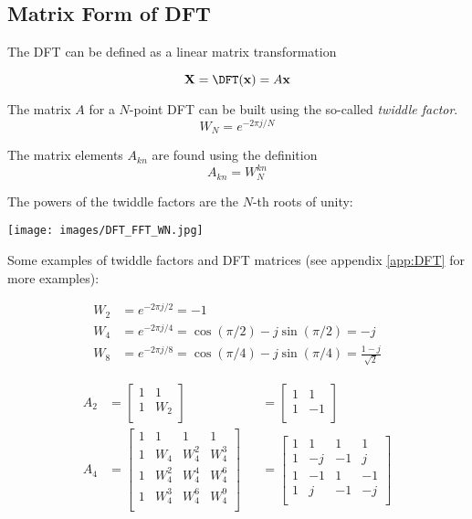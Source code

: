 \subsection{Matrix Form of DFT}
The DFT can be defined as a linear matrix transformation

\begin{equation*}
	\mathbf{X} = \DFT(\mathbf{x}) = A \mathbf{x}
\end{equation*}

The matrix $A$ for a $N$-point DFT can be built using the so-called
\emph{twiddle factor}.
\begin{equation*}
	W_N = e^{-2 \pi j / N}
\end{equation*}

The matrix elements $A_{kn}$ are found using the definition
\begin{equation*}
	A_{kn} = W_N^{kn}
\end{equation*}

The powers of the twiddle factors are the $N$-th roots of unity:
\begin{center}
	\texttt{[image: images/DFT\_FFT\_WN.jpg]}
\end{center}

Some examples of twiddle factors and DFT matrices (see appendix
\ref{app:DFT} for more examples):

\begin{align*}
	W_2 &= e^{-2\pi j / 2} = -1 \\
	W_4 &= e^{-2\pi j / 4} = \cos(\pi/2) - j\sin(\pi/2) = -j \\
	W_8 &= e^{-2\pi j / 8} = \cos(\pi/4) - j\sin(\pi/4) = \frac{1-j}{\sqrt{2}}
\end{align*}

\begin{align*}
	A_2 &=
		\begin{bmatrix}
			1& 1 \\
			1& W_2 \\
		\end{bmatrix}
		&&=
		\begin{bmatrix}
			1& 1 \\
			1& -1 \\
		\end{bmatrix}	 \\
	A_4 &=
		\begin{bmatrix}
			1& 1& 1& 1 \\
			1& W_4& W_4^2& W_4^3 \\
			1& W_4^2& W_4^4& W_4^6 \\
			1& W_4^3& W_4^6& W_4^9 \\
		\end{bmatrix}
		&&=
		\begin{bmatrix}
			1& 1& 1& 1 \\
			1& -j& -1& j \\
			1& -1& 1& -1 \\
			1& j& -1& -j \\
		\end{bmatrix}
\end{align*}

